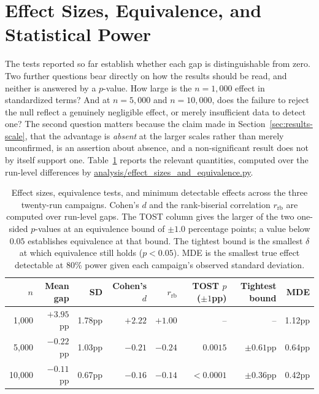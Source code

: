 \section{Effect Sizes, Equivalence, and Statistical Power}
\label{sec:results-effect-sizes}

The tests reported so far establish whether each gap is distinguishable from
zero. Two further questions bear directly on how the results should be read, and
neither is answered by a $p$-value. How large is the $n=1{,}000$ effect in
standardized terms? And at $n=5{,}000$ and $n=10{,}000$, does the failure to
reject the null reflect a genuinely negligible effect, or merely insufficient
data to detect one? The second question matters because the claim made in
Section~\ref{sec:results-scale}, that the advantage is \emph{absent} at the
larger scales rather than merely unconfirmed, is an assertion about absence,
and a non-significant result does not by itself support one.
Table~\ref{tab:effect-sizes} reports the relevant quantities, computed over the
run-level differences by \url{analysis/effect_sizes_and_equivalence.py}.

\begin{table}[htbp]
\centering
\caption[Effect sizes, equivalence tests, and detectable effects]{Effect sizes, equivalence tests, and minimum detectable effects across
the three twenty-run campaigns. Cohen's $d$ and the rank-biserial correlation
$r_{\text{rb}}$ are computed over run-level gaps. The TOST column gives the
larger of the two one-sided $p$-values at an equivalence bound of
$\pm1.0$ percentage points; a value below $0.05$ establishes equivalence at that
bound. The tightest bound is the smallest $\delta$ at which equivalence still
holds ($p<0.05$). MDE is the smallest true effect detectable at 80\% power given
each campaign's observed standard deviation.}
\label{tab:effect-sizes}
\small
\begin{tabular}{rrrrrrrr}
\toprule
$n$ & Mean gap & SD & Cohen's $d$ & $r_{\text{rb}}$ & TOST $p$ ($\pm1$pp) &
  Tightest bound & MDE \\
\midrule
1{,}000  & $+3.95$pp & 1.78pp & $+2.22$ & $+1.00$ & --      & --          & 1.12pp \\
5{,}000  & $-0.22$pp & 1.03pp & $-0.21$ & $-0.24$ & $0.0015$ & $\pm0.61$pp & 0.64pp \\
10{,}000 & $-0.11$pp & 0.67pp & $-0.16$ & $-0.14$ & $<0.0001$ & $\pm0.36$pp & 0.42pp \\
\bottomrule
\end{tabular}
\end{table}

